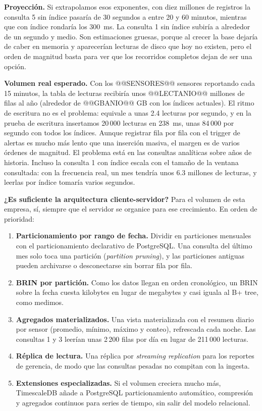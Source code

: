 \textbf{Proyección.} Si extrapolamos esos exponentes, con diez millones de registros la consulta 5 sin índice pasaría de 30 segundos a entre 20 y 60 minutos, mientras que con índice rondaría los 300~ms. La consulta 1 sin índice subiría a alrededor de un segundo y medio. Son estimaciones gruesas, porque al crecer la base dejaría de caber en memoria y aparecerían lecturas de disco que hoy no existen, pero el orden de magnitud basta para ver que los recorridos completos dejan de ser una opción.

\textbf{Volumen real esperado.} Con los @@SENSORES@@ sensores reportando cada 15 minutos, la tabla de lecturas recibiría unos @@LECTANIO@@ millones de filas al año (alrededor de @@GBANIO@@ GB con los índices actuales). El ritmo de escritura no es el problema: equivale a unas 2.4 lecturas por segundo, y en la prueba de escritura insertamos 20\,000 lecturas en 238~ms, unas 84\,000 por segundo con todos los índices. Aunque registrar fila por fila con el trigger de alertas es mucho más lento que una inserción masiva, el margen es de varios órdenes de magnitud. El problema está en las consultas analíticas sobre años de historia. Incluso la consulta 1 con índice escala con el tamaño de la ventana consultada: con la frecuencia real, un mes tendría unos 6.3 millones de lecturas, y leerlas por índice tomaría varios segundos.

\textbf{¿Es suficiente la arquitectura cliente-servidor?} Para el volumen de esta empresa, sí, siempre que el servidor se organice para ese crecimiento. En orden de prioridad:

\begin{enumerate}[leftmargin=1.6em,itemsep=0.15em]
\item \textbf{Particionamiento por rango de fecha.} Dividir  en particiones mensuales con el particionamiento declarativo de PostgreSQL. Una consulta del último mes solo toca una partición (\emph{partition pruning}), y las particiones antiguas pueden archivarse o desconectarse sin borrar fila por fila.
\item \textbf{BRIN por partición.} Como los datos llegan en orden cronológico, un BRIN sobre la fecha cuesta kilobytes en lugar de megabytes y casi iguala al B+ tree, como medimos.
\item \textbf{Agregados materializados.} Una vista materializada con el resumen diario por sensor (promedio, mínimo, máximo y conteo), refrescada cada noche. Las consultas 1 y 3 leerían unas 2\,200 filas por día en lugar de 211\,000 lecturas.
\item \textbf{Réplica de lectura.} Una réplica por \emph{streaming replication} para los reportes de gerencia, de modo que las consultas pesadas no compitan con la ingesta.
\item \textbf{Extensiones especializadas.} Si el volumen creciera mucho más, TimescaleDB añade a PostgreSQL particionamiento automático, compresión y agregados continuos para series de tiempo, sin salir del modelo relacional.
\end{enumerate}


